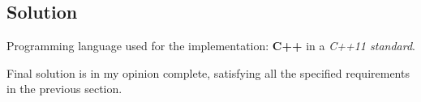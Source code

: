 \pagebreak

\subsection{Solution}

Programming language used for the implementation: \textbf{C++} in a \textit{C++11 standard}.

Final solution is in my opinion complete, satisfying all the specified requirements in the previous section.

